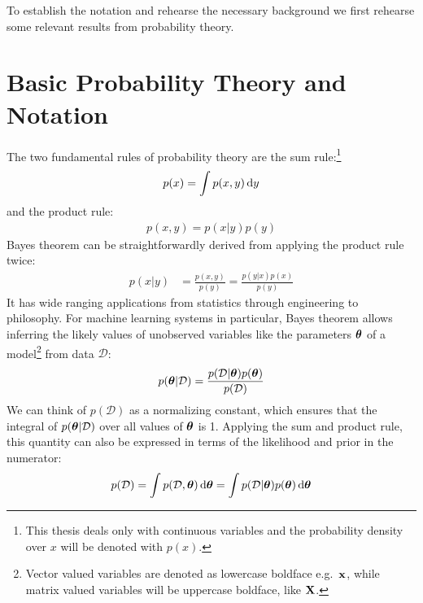 \documentclass[../thesis.tex]{subfiles}
\begin{document}
To establish the notation and rehearse the necessary background we first rehearse some relevant results from probability theory. 

\section{Basic Probability Theory and Notation}
The two fundamental rules of probability theory are the sum rule:\footnote{This thesis deals only with continuous variables and the probability density over $x$ will be denoted with $p(x)$.}
\begin{equation}
    \begin{split}
        p(x) = \int p(x, y) \mathop{}\!\mathrm{d} y
    \end{split}
\end{equation}
and the product rule:
\begin{equation}
    \begin{split}
        p(x, y) = p(x|y)p(y)
    \end{split}
\end{equation}
Bayes theorem can be straightforwardly derived from applying the product rule twice:
\begin{equation}
    \begin{split}
        p(x | y) &= \frac{p(x, y)}{p(y)} = \frac{p(y | x) p(x)}  {p(y)}
    \end{split}
\end{equation}
It has wide ranging applications from statistics through engineering to philosophy. For machine learning systems in particular, Bayes theorem allows inferring the likely values of unobserved variables like the parameters $\boldsymbol{\mathbf{\theta}}$ of a model\footnote{Vector valued variables are denoted as lowercase boldface e.g.\ $\boldsymbol{\mathbf{x}}$, while matrix valued variables will be uppercase boldface, like $\boldsymbol{\mathbf{X}}$.} from data $\mathcal{D}$:
\begin{equation}
    \begin{split}
        p(\boldsymbol{\mathbf{\theta}} | \mathcal{D}) = \frac{p(\mathcal{D} | \boldsymbol{\mathbf{\theta}}) p(\boldsymbol{\mathbf{\theta}})}  {p(\mathcal{D})}
    \end{split}
\end{equation}
We can think of $p(\mathcal{D})$ as a normalizing constant, which ensures that the integral of $p(\boldsymbol{\mathbf{\theta}} | \mathcal{D})$ over all values of $\boldsymbol{\mathbf{\theta}}$ is 1. Applying the sum and product rule, this quantity can also be expressed in terms of the likelihood and prior in the numerator:
\begin{equation}
    \begin{split}
        p(\mathcal{D}) = \int p(\mathcal{D}, \boldsymbol{\mathbf{\theta}}) \mathop{}\!\mathrm{d} \boldsymbol{\mathbf{\theta}} = \int p(\mathcal{D} | \boldsymbol{\mathbf{\theta}}) p(\boldsymbol{\mathbf{\theta}}) \mathop{}\!\mathrm{d} \boldsymbol{\mathbf{\theta}}
    \end{split}
\end{equation}
\end{document}
